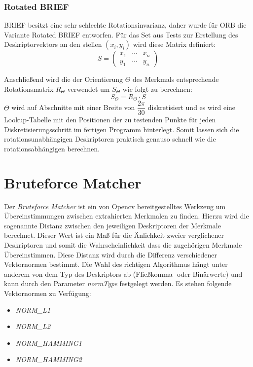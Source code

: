 \subsubsection{Rotated BRIEF}
BRIEF besitzt eine sehr schlechte Rotationsinvarianz, daher wurde für ORB die Variante Rotated BRIEF entworfen.
Für das Set aus Tests zur Erstellung des Deskriptorvektors an den stellen $(x_i, y_i)$ wird diese Matrix definiert:
\begin{equation}
S=
\begin{pmatrix}
x_1 & \cdots & x_n \\
y_1 & \cdots & y_n
\end{pmatrix}
\end{equation}

Anschließend wird die der Orientierung $\Theta $ des Merkmals entsprechende Rotationsmatrix $R_\Theta$ verwendet um $S_\Theta $ wie folgt zu berechnen:
\begin{equation}
S_\Theta = R_\Theta \cdot S
\end{equation}
$\Theta$ wird auf Abschnitte mit einer Breite von $\dfrac{2\pi}{30}$ diskretisiert und es wird eine Lookup-Tabelle mit den Positionen der zu testenden Punkte für jeden Diskretisierungsschritt im fertigen Programm hinterlegt.
Somit lassen sich die rotationsunabhängigen Deskriptoren praktisch genauso schnell wie die rotationsabhängigen berechnen. \cite{rub11}

\section{Bruteforce Matcher}
Der \emph{Bruteforce Matcher} ist ein von Opencv bereitgestelltes Werkzeug um Übereinstimmungen zwischen extrahierten Merkmalen zu finden. 
Hierzu wird die sogenannte Distanz zwischen den jeweiligen Deskriptoren der Merkmale berechnet.
Dieser Wert ist ein Maß für die Änlichkeit zweier verglichener Deskriptoren und somit die Wahrscheinlichkeit dass die zugehörigen Merkmale Übereinstimmen.
Diese Distanz wird durch die Differenz verschiedener Vektornormen bestimmt.
Die Wahl des richtigen Algorithmus hängt unter anderem von dem Typ des Deskriptors ab (Fließkomma- oder Binärwerte) und kann durch den Parameter \emph{normType} festgelegt werden. Es stehen folgende Vektornormen zu Verfügung:
\begin{itemize}
\item \emph{NORM\_L1}
\item \emph{NORM\_L2}
\item \emph{NORM\_HAMMING1}
\item \emph{NORM\_HAMMING2}
\end{itemize}

